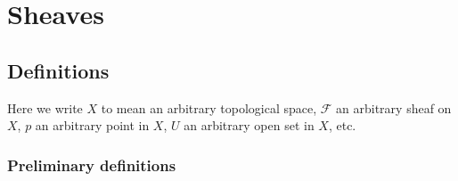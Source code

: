 \documentclass[10pt]{article}
\newcommand{\fsheaf}{\mathcal{F}}
\begin{document}
    \section{Sheaves}
    
        \subsection{Definitions}
    
            Here we write $X$ to mean an arbitrary topological space, $\fsheaf$ an arbitrary sheaf on $X$, $p$ an arbitrary point in $X$, $U$ an arbitrary open set in $X$, etc.
            
            \subsubsection{Preliminary definitions}
    
\end{document}
